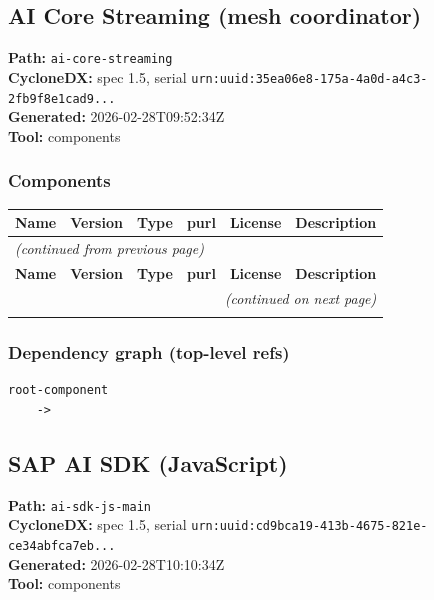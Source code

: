 \documentclass[11pt,a4paper]{article}
\begin{document}
\subsection{AI Core Streaming (mesh coordinator)}
\textbf{Path:} \texttt{ai-core-streaming}
\\ \textbf{CycloneDX:} spec 1.5, serial \texttt{urn:uuid:35ea06e8-175a-4a0d-a4c3-2fb9f8e1cad9...}
\\ \textbf{Generated:} 2026-02-28T09:52:34Z
\\ \textbf{Tool:} components

\subsubsection*{Components}
\begin{longtable}{|p{4cm}|p{2cm}|p{1.6cm}|p{5cm}|p{1.5cm}|p{3.5cm}|}
\toprule
\rowcolor{sbomhdr}\textbf{Name} & \textbf{Version} & \textbf{Type} & \textbf{purl} & \textbf{License} & \textbf{Description} \\
\midrule
\endfirsthead
\multicolumn{6}{l}{\small\itshape (continued from previous page)} \\
\toprule
\rowcolor{sbomhdr}\textbf{Name} & \textbf{Version} & \textbf{Type} & \textbf{purl} & \textbf{License} & \textbf{Description} \\
\midrule
\endhead
\midrule
\multicolumn{6}{r}{\small\itshape (continued on next page)} \\
\endfoot
\bottomrule
\endlastfoot
\end{longtable}

\subsubsection*{Dependency graph (top-level refs)}
\begin{lstlisting}[style=depgraph]
  root-component
    -> 
\end{lstlisting}

\subsection{SAP AI SDK (JavaScript)}
\textbf{Path:} \texttt{ai-sdk-js-main}
\\ \textbf{CycloneDX:} spec 1.5, serial \texttt{urn:uuid:cd9bca19-413b-4675-821e-ce34abfca7eb...}
\\ \textbf{Generated:} 2026-02-28T10:10:34Z
\\ \textbf{Tool:} components
\end{document}
